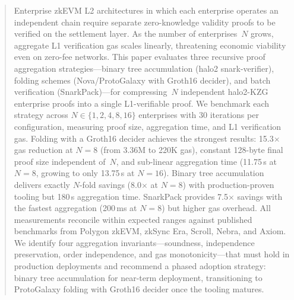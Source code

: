 \begin{abstract}
Enterprise zkEVM L2 architectures in which each enterprise operates an
independent chain require separate zero-knowledge validity proofs to be
verified on the settlement layer. As the number of enterprises~$N$ grows,
aggregate L1 verification gas scales linearly, threatening economic
viability even on zero-fee networks. This paper evaluates three recursive
proof aggregation strategies---binary tree accumulation (halo2
snark-verifier), folding schemes (Nova/ProtoGalaxy with Groth16 decider),
and batch verification (SnarkPack)---for compressing~$N$ independent
halo2-KZG enterprise proofs into a single L1-verifiable proof. We
benchmark each strategy across $N \in \{1, 2, 4, 8, 16\}$ enterprises
with 30 iterations per configuration, measuring proof size, aggregation
time, and L1 verification gas. Folding with a Groth16 decider achieves
the strongest results: 15.3$\times$ gas reduction at $N{=}8$ (from
3.36M to 220K gas), constant 128-byte final proof size independent of~$N$,
and sub-linear aggregation time (11.75\,s at $N{=}8$, growing to only
13.75\,s at $N{=}16$). Binary tree accumulation delivers exactly
$N$-fold savings (8.0$\times$ at $N{=}8$) with production-proven tooling
but 180\,s aggregation time. SnarkPack provides 7.5$\times$ savings with
the fastest aggregation (200\,ms at $N{=}8$) but higher gas overhead.
All measurements reconcile within expected ranges against published
benchmarks from Polygon zkEVM, zkSync Era, Scroll, Nebra, and Axiom.
We identify four aggregation invariants---soundness, independence
preservation, order independence, and gas monotonicity---that must hold
in production deployments and recommend a phased adoption strategy:
binary tree accumulation for near-term deployment, transitioning to
ProtoGalaxy folding with Groth16 decider once the tooling matures.
\end{abstract}
